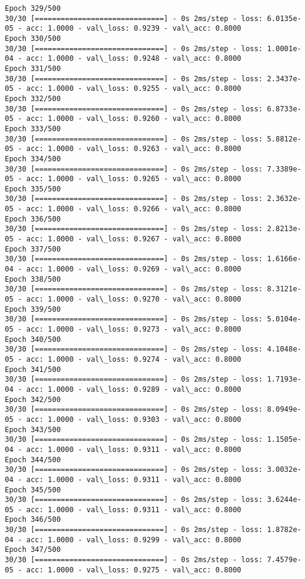 \documentclass[11pt]{article}
\begin{document}
\begin{Verbatim}[commandchars=\\\{\}]
Epoch 329/500
30/30 [==============================] - 0s 2ms/step - loss: 6.0135e-05 - acc: 1.0000 - val\_loss: 0.9239 - val\_acc: 0.8000
Epoch 330/500
30/30 [==============================] - 0s 2ms/step - loss: 1.0001e-04 - acc: 1.0000 - val\_loss: 0.9248 - val\_acc: 0.8000
Epoch 331/500
30/30 [==============================] - 0s 2ms/step - loss: 2.3437e-05 - acc: 1.0000 - val\_loss: 0.9255 - val\_acc: 0.8000
Epoch 332/500
30/30 [==============================] - 0s 2ms/step - loss: 6.8733e-05 - acc: 1.0000 - val\_loss: 0.9260 - val\_acc: 0.8000
Epoch 333/500
30/30 [==============================] - 0s 2ms/step - loss: 5.8812e-05 - acc: 1.0000 - val\_loss: 0.9263 - val\_acc: 0.8000
Epoch 334/500
30/30 [==============================] - 0s 2ms/step - loss: 7.3389e-05 - acc: 1.0000 - val\_loss: 0.9265 - val\_acc: 0.8000
Epoch 335/500
30/30 [==============================] - 0s 2ms/step - loss: 2.3632e-05 - acc: 1.0000 - val\_loss: 0.9266 - val\_acc: 0.8000
Epoch 336/500
30/30 [==============================] - 0s 2ms/step - loss: 2.8213e-05 - acc: 1.0000 - val\_loss: 0.9267 - val\_acc: 0.8000
Epoch 337/500
30/30 [==============================] - 0s 2ms/step - loss: 1.6166e-04 - acc: 1.0000 - val\_loss: 0.9269 - val\_acc: 0.8000
Epoch 338/500
30/30 [==============================] - 0s 2ms/step - loss: 8.3121e-05 - acc: 1.0000 - val\_loss: 0.9270 - val\_acc: 0.8000
Epoch 339/500
30/30 [==============================] - 0s 2ms/step - loss: 5.0104e-05 - acc: 1.0000 - val\_loss: 0.9273 - val\_acc: 0.8000
Epoch 340/500
30/30 [==============================] - 0s 2ms/step - loss: 4.1048e-05 - acc: 1.0000 - val\_loss: 0.9274 - val\_acc: 0.8000
Epoch 341/500
30/30 [==============================] - 0s 2ms/step - loss: 1.7193e-04 - acc: 1.0000 - val\_loss: 0.9289 - val\_acc: 0.8000
Epoch 342/500
30/30 [==============================] - 0s 2ms/step - loss: 8.0949e-05 - acc: 1.0000 - val\_loss: 0.9303 - val\_acc: 0.8000
Epoch 343/500
30/30 [==============================] - 0s 2ms/step - loss: 1.1505e-04 - acc: 1.0000 - val\_loss: 0.9311 - val\_acc: 0.8000
Epoch 344/500
30/30 [==============================] - 0s 2ms/step - loss: 3.0032e-04 - acc: 1.0000 - val\_loss: 0.9311 - val\_acc: 0.8000
Epoch 345/500
30/30 [==============================] - 0s 2ms/step - loss: 3.6244e-05 - acc: 1.0000 - val\_loss: 0.9311 - val\_acc: 0.8000
Epoch 346/500
30/30 [==============================] - 0s 2ms/step - loss: 1.8782e-04 - acc: 1.0000 - val\_loss: 0.9299 - val\_acc: 0.8000
Epoch 347/500
30/30 [==============================] - 0s 2ms/step - loss: 7.4579e-05 - acc: 1.0000 - val\_loss: 0.9275 - val\_acc: 0.8000

\end{Verbatim}
\end{document}
